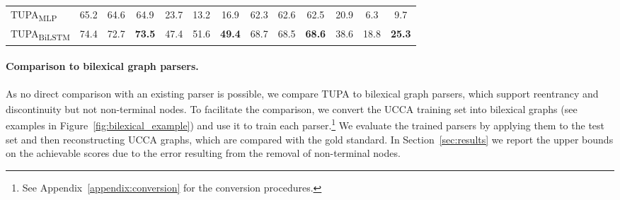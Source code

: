 \documentclass[11pt,a4paper]{article}
\newcommand{\parser}[1]{TUPA\textsubscript{#1}}
\newcommand{\secref}[1]{Section~\ref{#1}}
\newcommand{\figref}[1]{Figure~\ref{#1}}
\begin{document}
\begin{table*}
\begin{tabular}{l|ccc|ccc||ccc|ccc}
\parser{MLP}
& 65.2 & 64.6 & 64.9 & 23.7 & 13.2 & 16.9
& 62.3 & 62.6 & 62.5 & 20.9 & 6.3 & 9.7 \\
\parser{BiLSTM}
& 74.4 & 72.7 & \textbf{73.5} & 47.4 & 51.6 & \textbf{49.4}
& 68.7 & 68.5 & \textbf{68.6} & 38.6 & 18.8 & \textbf{25.3}
\end{tabular}
\caption{
  Main experimental results in percents, on the \textit{Wiki} test set (left)
  and the \textit{20K Leagues} set (right).
  Columns correspond to labeled precision, recall and F-score,
  for both primary and remote edges.
  \parser{BiLSTM} obtains the highest F-scores in all metrics, surpassing the
  bilexical parsers, tree parsers and other classifiers.
}
\label{table:results}
\end{table*}

\paragraph{Comparison to bilexical graph parsers.}
As no direct comparison with an existing parser is possible,
we compare \parser{} to bilexical graph parsers,
which support reentrancy and discontinuity but not non-terminal nodes.
To facilitate the comparison, we convert the UCCA training set into bilexical graphs
(see examples in \figref{fig:bilexical_example})
and use it to train each parser.\footnote{See Appendix~\ref{appendix:conversion}
for the conversion procedures.}
We evaluate the trained parsers by applying them to the test set
and then reconstructing UCCA graphs, which are compared with the gold standard.
In \secref{sec:results} we report the upper bounds on the achievable scores due to the error
resulting from the removal of non-terminal nodes.
\end{document}
